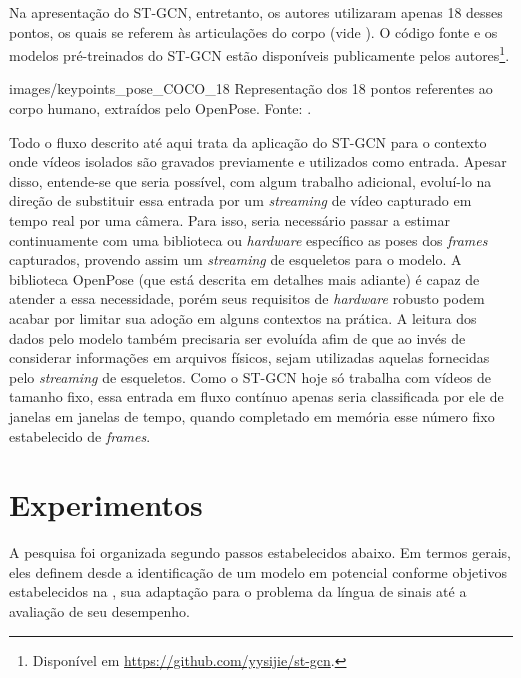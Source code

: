 Na apresentação do ST-GCN, entretanto, os autores utilizaram apenas 18 desses pontos, os quais se referem às articulações do corpo (vide ). O código fonte e os modelos pré-treinados do ST-GCN estão disponíveis publicamente pelos autores\footnote{
    Disponível em \url{https://github.com/yysijie/st-gcn}.
}.

    {images/keypoints_pose_COCO_18}
    {Representação dos 18 pontos referentes ao corpo humano, extraídos pelo OpenPose. Fonte: \cite{openpose-output-2018}.}

Todo o fluxo descrito até aqui trata da aplicação do ST-GCN para o contexto onde vídeos isolados são gravados previamente e utilizados como entrada. Apesar disso, entende-se que seria possível, com algum trabalho adicional, evoluí-lo na direção de substituir essa entrada por um \textit{streaming} de vídeo capturado em tempo real por uma câmera. Para isso, seria necessário passar a estimar continuamente com uma biblioteca ou \textit{hardware} específico as poses dos \textit{frames} capturados, provendo assim um \textit{streaming} de esqueletos para o modelo. A biblioteca OpenPose (que está descrita em detalhes mais adiante) é capaz de atender a essa necessidade, porém seus requisitos de \textit{hardware} robusto podem acabar por limitar sua adoção em alguns contextos na prática. A leitura dos dados pelo modelo também precisaria ser evoluída afim de que ao invés de considerar informações em arquivos físicos, sejam utilizadas aquelas fornecidas pelo \textit{streaming} de esqueletos. Como o ST-GCN hoje só trabalha com vídeos de tamanho fixo, essa entrada em fluxo contínuo apenas seria classificada por ele de janelas em janelas de tempo, quando completado em memória esse número fixo estabelecido de \textit{frames}.


\section{Experimentos} %
\label{sec:experimentos}

A pesquisa foi organizada segundo passos estabelecidos abaixo. Em termos gerais, eles definem desde a identificação de um modelo em potencial conforme objetivos estabelecidos na , sua adaptação para o problema da língua de sinais até a avaliação de seu desempenho.

